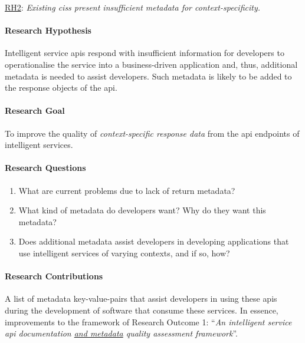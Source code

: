\begin{titled-frame}{\underline{RH2}: \textit{Existing \glspl{cis} present insufficient metadata for context-specificity.} }
\vspace{-12pt}
\paragraph{Research Hypothesis}
Intelligent service \glspl{api} respond with insufficient information for developers to operationalise the service into a business-driven application and, thus, additional metadata is needed to assist developers. Such metadata is likely to be added to the response objects of the \gls{api}.

\paragraph{Research Goal}
To improve the quality of \textit{context-specific response data} from the \gls{api} endpoints of intelligent services.

\paragraph{Research Questions}
\begin{enumerate}[label=\textbf{RQ2.\arabic*.}, ref=RQ2.\arabic*, leftmargin=3.5\parindent, rightmargin=1\parindent]
  \item What are current problems due to lack of return metadata?
  \label{rqs:metadata:what-problems-due-to-lack-of-metadata}
  
  
  \item What kind of metadata do developers want? Why do they want this metadata?
  \label{rqs:metadata:what-metadata-do-devs-want-and-why}
  
  \item Does additional metadata assist developers in developing applications that use intelligent services of varying contexts, and if so, how?
  \label{rqs:metadata:how-does-metadata-assist-devs}
\end{enumerate}

\paragraph{Research Contributions} A list of metadata key-value-pairs that assist developers in using these \glspl{api} during the development of software that consume these services. In essence, improvements to the framework of Research Outcome 1: ``\textit{An intelligent service \gls{api} documentation \underline{\upshape and metadata} quality assessment framework}''.


\end{titled-frame}
